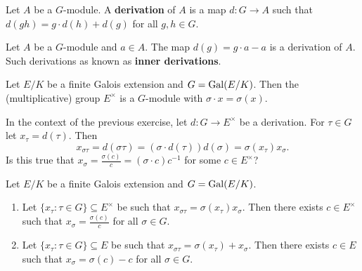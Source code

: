 \begin{definition}
    Let $A$ be a $G$-module. 
    A \textbf{derivation} of $A$ is a map $d\colon G\to A$ such that
    $d(gh)=g\cdot d(h)+d(g)$ for all $g,h\in G$. 
\end{definition}

Let $A$ be a $G$-module and $a\in A$. The map 
$d(g)=g\cdot a-a$ is a derivation of $A$. 
Such derivations as known as \textbf{inner derivations}. 

\begin{exercise}
    Let $E/K$ be a finite Galois extension and $G=\operatorname{Gal}(E/K)$. 
    Then the (multiplicative) group $E^\times$ is a $G$-module with
    $\sigma\cdot x=\sigma(x)$. 
\end{exercise}

In the context of the previous exercise, 
let $d\colon G\to E^\times$ be a derivation. For $\tau\in G$ let 
$x_\tau=d(\tau)$. Then
\[
x_{\sigma\tau}=d(\sigma\tau)=(\sigma\cdot d(\tau))d(\sigma)=\sigma(x_\tau)x_\sigma.
\]
Is this true that $x_\sigma=\frac{\sigma(c)}{c}=(\sigma\cdot c)c^{-1}$ 
for some $c\in E^\times$?

\begin{proposition}
    Let $E/K$ be a finite Galois extension and $G=\operatorname{Gal}(E/K)$. 
    \begin{enumerate}
        \item Let $\{x_\tau:\tau\in G\}\subseteq E^\times$ be such that 
            $x_{\sigma\tau}=\sigma(x_\tau)x_\sigma$. Then there exists
            $c\in E^\times$ such that $x_\sigma=\frac{\sigma(c)}{c}$ for all $\sigma\in G$. 
        \item Let $\{x_\tau:\tau\in G\}\subseteq E$ be such that 
            $x_{\sigma\tau}=\sigma(x_\tau)+x_\sigma$. Then there exists
            $c\in E$ such that $x_\sigma=\sigma(c)-c$ for all $\sigma\in G$.  
    \end{enumerate}
\end{proposition}

